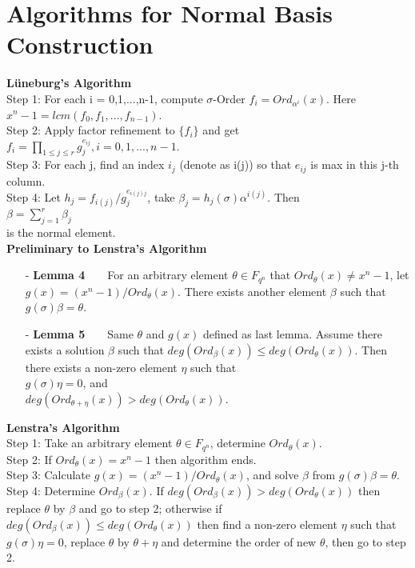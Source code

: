 \documentclass[12pt]{article}
\begin{document}
\section{Algorithms for Normal Basis Construction}
\textbf{L\"uneburg's Algorithm}\\
Step 1: For each i = 0,1,...,n-1, compute $\sigma$-Order $f_i = Ord_{\alpha^i}(x)$. Here $x^n - 1 = lcm(f_0,f_1,...,f_{n-1})$.\\
Step 2: Apply factor refinement to $\{f_i\}$ and get $f_i = \prod_{1\leq j\leq r} g_{j}^{e_{ij}}, i = 0,1,...,n-1$.\\
Step 3: For each j, find an index $i_j$ (denote as i(j)) so that $e_{ij}$ is max in this j-th column.\\
Step 4: Let $h_j = f_{i(j)}/g_{j}^{e_{i(j)j}}$, take $\beta_j = h_j(\sigma)\alpha^{i(j)}$. Then\\
\indent\indent\indent\indent\indent\indent\indent\indent\indent$\beta = \displaystyle\sum_{j=1}^{r} \beta_j$\\
is the normal element.\\

\textbf{Preliminary to Lenstra's Algorithm}
\begin{itemize}
\item[-] \textbf{Lemma 4}\ \ \ \ For an arbitrary element $\theta \in F_{q^n}$ that $Ord_\theta(x) \neq x^n - 1$,
let $g(x) = (x^n - 1)/Ord_\theta(x)$. There exists another element $\beta$ such that $g(\sigma)\beta = \theta$.\
\item[-] \textbf{Lemma 5}\ \ \ \ Same $\theta$ and $g(x)$ defined as last lemma. Assume there exists a solution 
$\beta$ such that $deg(Ord_\beta(x)) \leq deg(Ord_\theta(x))$. Then there exists a non-zero element $\eta$ such that\\
$g(\sigma)\eta = 0$, and\\
$deg(Ord_{\theta+\eta}(x)) > deg(Ord_\theta(x))$.\\

\end{itemize} 

\textbf{Lenstra's Algorithm}\\
Step 1: Take an arbitrary element $\theta \in F_{q^n}$, determine $Ord_\theta(x)$.\\
Step 2: If $Ord_\theta(x) = x^n - 1$ then algorithm ends.\\
Step 3: Calculate $g(x) = (x^n - 1)/Ord_\theta(x)$, and solve $\beta$ from $g(\sigma)\beta = \theta$.\\
Step 4: Determine $Ord_\beta(x)$. If $deg(Ord_\beta(x)) > deg(Ord_\theta(x))$ then replace $\theta$ by $\beta$ and go to step 2;
	otherwise if $deg(Ord_\beta(x)) \leq deg(Ord_\theta(x))$ then find a non-zero element $\eta$ such that $g(\sigma)\eta = 0$,
	replace $\theta$ by $\theta + \eta$ and determine the order of new $\theta$, then go to step 2.\\
\end{document}
